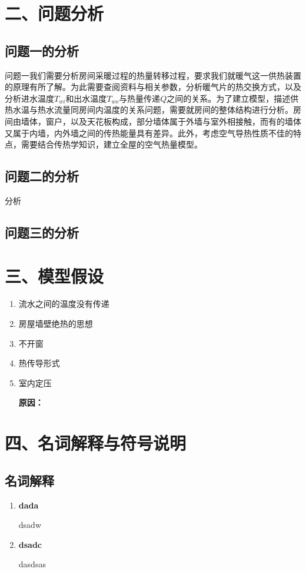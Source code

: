 \documentclass{my_paper}
\begin{document}
\section{二、问题分析}
\subsection{问题一的分析}

问题一我们需要分析房间采暖过程的热量转移过程，要求我们就暖气这一供热装置的原理有所了解。为此需要查阅资料与相关参数，分析暖气片的热交换方式，以及分析进水温度$T_{wi}$和出水温度$ T_{wo} $与热量传递$Q$之间的关系。为了建立模型，描述供热水温与热水流量同房间内温度的关系问题，需要就房间的整体结构进行分析。房间由墙体，窗户，以及天花板构成，部分墙体属于外墙与室外相接触，而有的墙体又属于内墙，内外墙之间的传热能量具有差异。此外，考虑空气导热性质不佳的特点，需要结合传热学知识，建立全屋的空气热量模型。

\subsection{问题二的分析}

分析

\subsection{问题三的分析}


\section{三、模型假设}
\begin{enumerate}
    \item 流水之间的温度没有传递
    \item 房屋墙壁绝热的思想
    \item 不开窗
    \item 热传导形式
    \item 室内定压
    
    \textbf{原因：}


\end{enumerate}

\section{四、名词解释与符号说明}
\subsection{名词解释}
\begin{enumerate}
    \item \textbf{dada}
    
    dsadw
    
    \item \textbf{dsadc}
    
    dasdsas

    
\end{enumerate}
\end{document}
